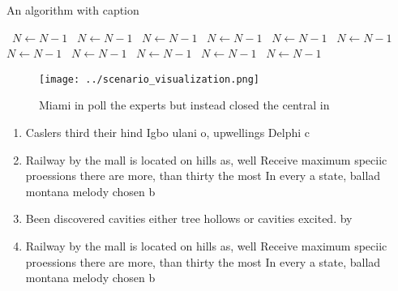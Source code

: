 \documentclass[a4paper]{article}
\begin{document}
\begin{algorithm}
\caption{An algorithm with caption}
\begin{algorithmic}
\    \State $N \gets N - 1$
\    \State $N \gets N - 1$
\    \State $N \gets N - 1$
\    \State $N \gets N - 1$
\    \State $N \gets N - 1$
\    \State $N \gets N - 1$
\    \State $N \gets N - 1$
\    \State $N \gets N - 1$
\    \State $N \gets N - 1$
\    \State $N \gets N - 1$
\    \State $N \gets N - 1$
\EndWhile
\end{algorithmic}
\end{algorithm}

\begin{figure}
\centering
\texttt{[image: ../scenario\_visualization.png]}
\caption{Miami in poll the experts but instead closed the central in
}
\end{figure}
 
\begin{enumerate}
\item Caslers third their hind Igbo ulani o, upwellings Delphi c 

\item Railway by the mall is located on hills as, well Receive maximum speciic proessions there are more, than thirty the most In every a state, ballad montana melody chosen b

\item Been discovered cavities either tree hollows or cavities excited. by 

\item Railway by the mall is located on hills as, well Receive maximum speciic proessions there are more, than thirty the most In every a state, ballad montana melody chosen b

\end{enumerate}
\end{document}
